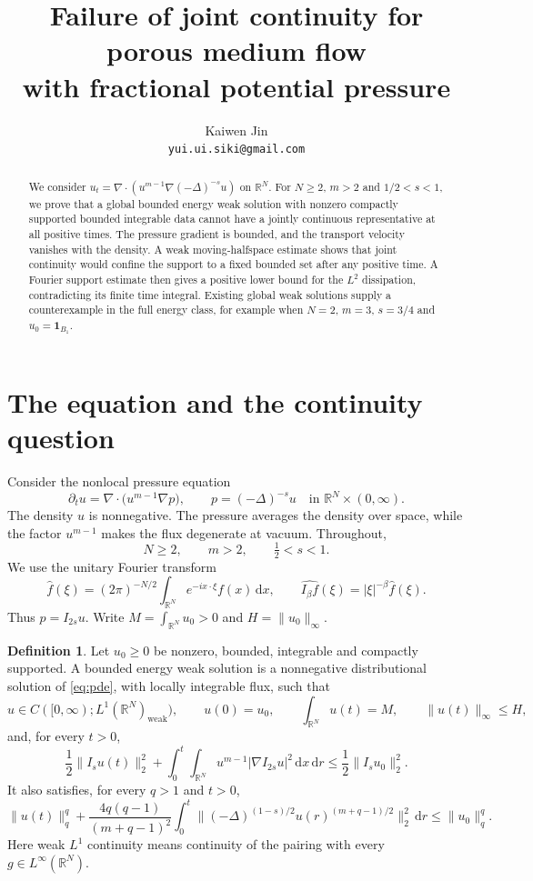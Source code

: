 \documentclass[11pt]{article}
\title{Failure of joint continuity for porous medium flow\\with fractional potential pressure}
\author{Kaiwen Jin\\\small\texttt{yui.ui.siki@gmail.com}}
\date{}
\theoremstyle{definition}
\newtheorem{definition}[theorem]{Definition}
\newcommand{\R}{\mathbb R}
\newcommand{\dd}{\,\mathrm d}
\begin{document}
\maketitle

\begin{abstract}
We consider $u_t=\nabla\cdot(u^{m-1}\nabla(-\Delta)^{-s}u)$ on $\R^N$. For $N\ge2$, $m>2$ and $1/2<s<1$, we prove that a global bounded energy weak solution with nonzero compactly supported bounded integrable data cannot have a jointly continuous representative at all positive times. The pressure gradient is bounded, and the transport velocity vanishes with the density. A weak moving-halfspace estimate shows that joint continuity would confine the support to a fixed bounded set after any positive time. A Fourier support estimate then gives a positive lower bound for the $L^2$ dissipation, contradicting its finite time integral. Existing global weak solutions supply a counterexample in the full energy class, for example when $N=2$, $m=3$, $s=3/4$ and $u_0=\mathbf1_{B_1}$.
\end{abstract}


\section{The equation and the continuity question}
Consider the nonlocal pressure equation
\begin{equation}\label{eq:pde}
 \partial_tu=\nabla\cdot\bigl(u^{m-1}\nabla p\bigr),
 \qquad p=(-\Delta)^{-s}u
 \quad\text{in }\R^N\times(0,\infty).
\end{equation}
The density $u$ is nonnegative. The pressure averages the density over space, while the factor $u^{m-1}$ makes the flux degenerate at vacuum. Throughout,
\[
 N\ge2,\qquad m>2,\qquad \tfrac12<s<1.
\]
We use the unitary Fourier transform
\[
 \widehat f(\xi)=(2\pi)^{-N/2}\int_{\R^N}e^{-ix\cdot\xi}f(x)\dd x,
 \qquad \widehat{I_\beta f}(\xi)=|\xi|^{-\beta}\widehat f(\xi).
\]
Thus $p=I_{2s}u$. Write $M=\int_{\R^N}u_0>0$ and $H=\|u_0\|_\infty$.

\begin{definition}\label{def:class}
Let $u_0\ge0$ be nonzero, bounded, integrable and compactly supported. A bounded energy weak solution is a nonnegative distributional solution of \eqref{eq:pde}, with locally integrable flux, such that
\[
 u\in C([0,\infty);L^1(\R^N)_{\mathrm{weak}}),\qquad
 u(0)=u_0,\qquad \int_{\R^N}u(t)=M,\qquad
 \|u(t)\|_\infty\le H,
\]
and, for every $t>0$,
\begin{equation}\label{eq:pressure-energy}
 \frac12\|I_su(t)\|_2^2+
 \int_0^t\!\int_{\R^N}u^{m-1}|\nabla I_{2s}u|^2\dd x\dd r
 \le\frac12\|I_su_0\|_2^2.
\end{equation}
It also satisfies, for every $q>1$ and $t>0$,
\begin{equation}\label{eq:lq}
 \|u(t)\|_q^q+
 \frac{4q(q-1)}{(m+q-1)^2}
 \int_0^t\bigl\|(-\Delta)^{(1-s)/2}
 u(r)^{(m+q-1)/2}\bigr\|_2^2\dd r
 \le\|u_0\|_q^q.
\end{equation}
Here weak $L^1$ continuity means continuity of the pairing with every $g\in L^\infty(\R^N)$.
\end{definition}
\end{document}
